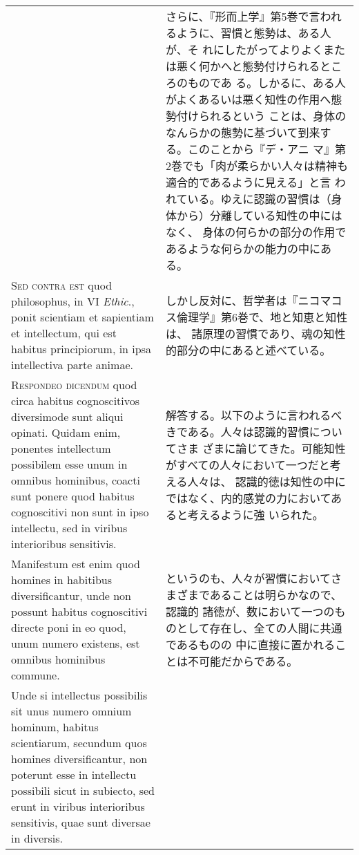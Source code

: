 \documentclass[10pt]{jsarticle} %
\begin{document}
\begin{longtable}{p{21em}p{21em}}
&

さらに、『形而上学』第5巻で言われるように、習慣と態勢は、ある人が、そ
れにしたがってよりよくまたは悪く何かへと態勢付けられるところのものであ
る。しかるに、ある人がよくあるいは悪く知性の作用へ態勢付けられるという
ことは、身体のなんらかの態勢に基づいて到来する。このことから『デ・アニ
マ』第2巻でも「肉が柔らかい人々は精神も適合的であるように見える」と言
われている。ゆえに認識の習慣は（身体から）分離している知性の中にはなく、
身体の何らかの部分の作用であるような何らかの能力の中にある。

\\




{\scshape Sed contra est} quod philosophus, in VI {\itshape Ethic}., ponit scientiam et
 sapientiam et intellectum, qui est habitus principiorum, in ipsa
 intellectiva parte animae.

&

しかし反対に、哲学者は『ニコマコス倫理学』第6巻で、地と知恵と知性は、
諸原理の習慣であり、魂の知性的部分の中にあると述べている。

\\




{\scshape Respondeo dicendum} quod circa habitus cognoscitivos diversimode sunt
 aliqui opinati. Quidam enim, ponentes intellectum possibilem esse
 unum in omnibus hominibus, coacti sunt ponere quod habitus
 cognoscitivi non sunt in ipso intellectu, sed in viribus interioribus
 sensitivis. 

&

解答する。以下のように言われるべきである。人々は認識的習慣についてさま
ざまに論じてきた。可能知性がすべての人々において一つだと考える人々は、
認識的徳は知性の中にではなく、内的感覚の力においてあると考えるように強
いられた。

\\


Manifestum est enim quod homines in habitibus
 diversificantur, unde non possunt habitus cognoscitivi directe poni
 in eo quod, unum numero existens, est omnibus hominibus commune. 


&

というのも、人々が習慣においてさまざまであることは明らかなので、認識的
諸徳が、数において一つのものとして存在し、全ての人間に共通であるものの
中に直接に置かれることは不可能だからである。

\\

Unde si intellectus possibilis sit unus numero omnium hominum, habitus
scientiarum, secundum quos homines diversificantur, non poterunt esse
in intellectu possibili sicut in subiecto, sed erunt in viribus
interioribus sensitivis, quae sunt diversae in diversis.


\end{longtable}
\end{document}
